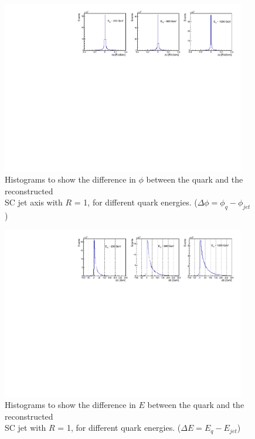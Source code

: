 \documentclass[a4paper,11pt, onecolumn]{article}
\begin{document}
 \vspace{-0.2cm}
 \begin{figure}[!thb]
    \begin{center}
      \includegraphics[width = 0.95\textwidth]{scq_phi}
      \caption{Histograms to show the difference in $\phi$ between the quark and the reconstructed \\
               SC jet axis with $R$ = 1, for different quark energies.  ($\Delta\phi = \phi_{q}-\phi_{jet}$) }
      \label{scq phi}
    \end{center}
  \end{figure}
 \vspace{-0.7cm}
  \begin{figure}[!thb]
    \begin{center}
      \includegraphics[width = 0.95\textwidth]{scq_E}
      \caption{Histograms to show the difference in $E$ between the quark and the reconstructed \\
               SC jet with $R$ = 1, for different quark energies. ($\Delta E = E_{q}-E_{jet}$)}
      \label{scq E}
    \end{center}
  \end{figure}
\end{document}
